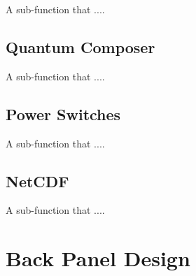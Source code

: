 A sub-function that ....

\subsection{Quantum Composer}\label{Sec:QCSubFunction}

A sub-function that ....

\subsection{Power Switches}\label{Sec:PowSwitchSubFunction}

A sub-function that ....

\subsection{NetCDF}\label{Sec:NetCDFSubFunction}

A sub-function that ....



\section{Back Panel Design}\label{Sec:BPDesign}

